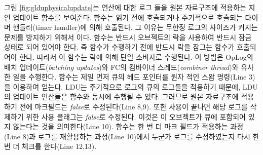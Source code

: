 그림 \ref{fig:glduphysicalupdate}는 연산에 대한 로그 들을 원본 자료구조에 적용하는 지연 업데이트 함수를 보여준다. 
 함수는 읽기 전에 호출되거나 주기적으로 호출되는 타이머 핸들러(timer handler)에 의해
호출된다. 
그 이유는 무한정 로그의 사이즈가 커지는 문제를 방지하기 위해서 이다.
 함수는 반드시 오브젝트의 락을 사용하여 반드시 잠금 상태로 되어 있어야 한다.
즉  함수가 수행하기 전에 반드시 락을 잠그는 함수가 호출되어야 한다.
따라서 이 함수는 락에 의해 단일 소비자로 수행된다. 
이 방법은 OpLog의 배치 업데이트(\textit{batching updates})와 FC의 컴바이너 
스레드(\textit{combiner thread})와 유사한 일을 수행한다. 
 함수는 제일 먼저 큐의 헤드 포인터를 원자 적인 스왑 명령(Line 3)을 이용하여 
얻는다.
LDU는 주기적으로 로그의 큐의 로그들을 적용하기 때문에, LDU의 업데이트 연산들은  함수와 
동시에 수행될 수 있다. 
그러므로 원본 자료구조에 적용하기 전에 마크필드는 \textit{false}로 수정된다(Line 8,9).
또한 사용이 끝나면 해당 로그를 삭제하기 위한 사용 플래그는 \textit{false}로 수정된다. 
이것은 이 오브젝트가 큐에 포함되어 있지 않는다는 것을 의미한다(Line 10).
 함수는 한 번 더 마크 필드가 적용하는 과정(Line 8)과 로그를 재활용하는 과정(Line
10)에서 누군가 로그를 수정하였는지 다시 한번 더 체크를 한다(Line 12,13).

